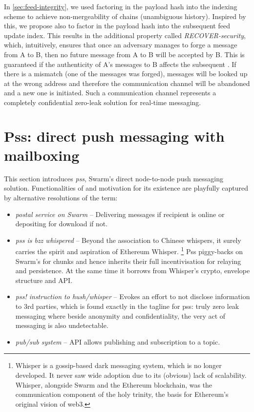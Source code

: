 In \ref{sec:feed-integrity}, we used factoring in the payload hash into the indexing scheme to achieve non-mergeability of chains (unambiguous history). Inspired by this, we propose also to factor in the payload hash into the subsequent feed update index. This results in the additional property called \emph{RECOVER-security},  which, intuitively, ensures that once an adversary manages to forge a message from A to B, then no future message from A to B will be accepted by B.
This is guaranteed if the authenticity of A's  messages to B affects the subsequent . If there is a mismatch (one of the messages was forged), messages will be looked up at the wrong address and therefore the communication channel will be abandoned and a new one is initiated. Such a communication channel represents a completely confidential zero-leak solution for real-time messaging.




\section{Pss: direct push messaging with mailboxing \statusgreen}\label{sec:pss}

\green{}

This section introduces \emph{pss}, Swarm's direct node-to-node push messaging solution. 
Functionalities of and motivation for its existence are playfully captured by alternative resolutions of the term:

\begin{itemize}
\item \emph{postal service on Swarm} -- Delivering messages if recipient is online or depositing for download if not.
\item \emph{pss is bzz whispered} -- Beyond the association to Chinese whispers, it surely carries the spirit and aspiration of Ethereum Whisper.%
%
\footnote{Whisper is a gossip-based dark messaging system, which is no longer developed. It never saw wide adoption due to its (obvious) lack of scalability. Whisper, alongside Swarm and the Ethereum blockchain, was the communication component of the holy trinity, the basis for Ethereum's original vision of web3.}
%
Pss piggy-backs on Swarm's  for chunks and hence inherits their full incentivisation for relaying and persistence. At the same time it borrows from Whisper's crypto, envelope structure and API.
\item \emph{pss! instruction to hush/whisper} -- Evokes an effort to not disclose information to 3rd parties, which is found exactly in the tagline for pss: truly zero leak messaging where beside anonymity and confidentiality, the very act of messaging is also undetectable.
\item  \emph{pub/sub system} -- API allows publishing and subscription to a topic.
\end{itemize}

